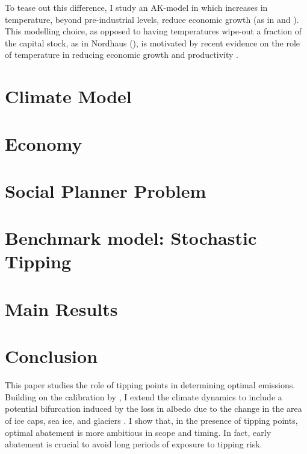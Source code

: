 \documentclass[11pt]{article}
\begin{document}
To tease out this difference, I study an AK-model in which increases in temperature, beyond pre-industrial levels, reduce economic growth (as in \cite{pindyck_economic_2013} and \cite{hambel_optimal_2021}). This modelling choice, as opposed to having temperatures wipe-out a fraction of the capital stock, as in Nordhaus (\citeyear{nordhaus_estimates_2014,nordhaus_question_2008,nordhaus_revisiting_2017}), is motivated by recent evidence on the role of temperature in reducing economic growth and productivity \citep{burke_global_2015, dietz_growth_2019}.


\section{Climate Model}



\section{Economy}




\section{Social Planner Problem}



\section{Benchmark model: Stochastic Tipping}



\section{Main Results}



\section{Conclusion}

This paper studies the role of tipping points in determining optimal emissions. Building on the calibration by \cite{hambel_optimal_2021}, I extend the climate dynamics to include a potential bifurcation induced by the loss in albedo due to the change in the area of ice caps, sea ice, and glaciers \cite{ashwin_tipping_2012,ashwin_extreme_2020}. I show that, in the presence of tipping points, optimal abatement is more ambitious in scope and timing. In fact, early abatement is crucial to avoid long periods of exposure to tipping risk.
\end{document}
